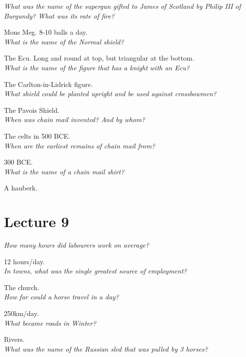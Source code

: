 \documentclass[12pt]{article}
\begin{document}
\textit{What was the name of the supergun gifted to James of Scotland by Philip III of Burgundy? What was its rate of fire?}

Mons Meg. 8-10 balls a day.\\

\textit{What is the name of the Normal shield?}

The Ecu. Long and round at top, but triangular at the bottom.\\

\textit{What is the name of the figure that has a knight with an Ecu?}

The Carlton-in-Lidrick figure.\\

\textit{What shield could be planted upright and be used against crossbowmen?}

The Pavois Shield.\\

\textit{When was chain mail invented? And by whom?}

The celts in 500 BCE.\\

\textit{When are the earliest remains of chain mail from?}

300 BCE.\\

\textit{What is the name of a chain mail shirt?}

A hauberk.\\

\section*{Lecture 9}

\textit{How many hours did labourers work on average?}

12 hours/day.\\

\textit{In towns, what was the single greatest source of employment?}

The church.\\

\textit{How far could a horse travel in a day?}

250km/day.\\

\textit{What became roads in Winter?}

Rivers.\\

\textit{What was the name of the Russian sled that was pulled by 3 horses?}
\end{document}
